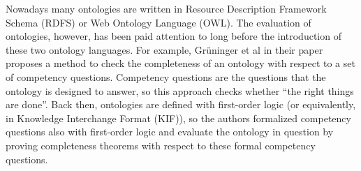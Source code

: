 Nowadays many ontologies are written in Resource Description Framework Schema \cite{brickley2000resource} (RDFS) or Web Ontology Language \cite{mcguinness2004owl} (OWL). The evaluation of ontologies, however, has been paid attention to long before the introduction of these two ontology languages. For example, Gr{\"u}ninger et al in their paper \cite{gruninger1995methodology} proposes a method to check the completeness of an ontology with respect to a set of competency questions. Competency questions are the questions that the ontology is designed to answer, so this approach checks whether ``the right things are done''. Back then, ontologies are defined with first-order logic (or equivalently, in Knowledge Interchange Format (KIF)), so the authors formalized competency questions also with first-order logic and evaluate the ontology in question by proving completeness theorems with respect to these formal competency questions.

